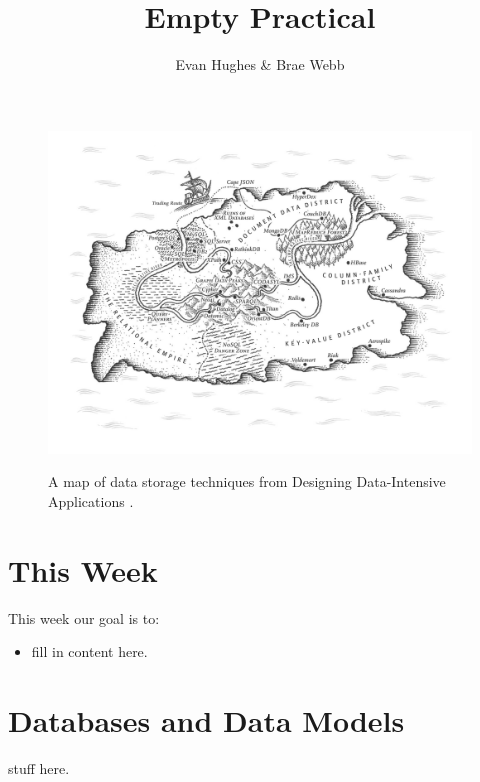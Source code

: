 \documentclass{csse4400}
\title{Empty Practical}
\author{Evan Hughes \& Brae Webb}
\date{\week{0}}
\begin{document}
\maketitle

\begin{figure}[h]
  \href{https://www.oreilly.com/library/view/designing-data-intensive-applications/9781491903063/ch02.html}{
    \includegraphics[width=\textwidth]{images/databases}
  }
\caption{A map of data storage techniques from Designing Data-Intensive Applications \cite{data-intensive}.}
\end{figure}

\section{This Week}
This week our goal is to:
\begin{itemize}
  \item fill in content here.
\end{itemize}

\section{Databases and Data Models}
stuff here.





\end{document}
